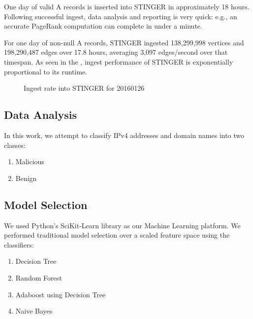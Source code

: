 \documentclass{acm_proc_article-sp}
\begin{document}
One day of valid A records is inserted into STINGER in approximately 18 hours. Following successful ingest, data analysis and reporting is very quick: e.g., an accurate PageRank computation can complete in under a minute.

For one day of non-null A records, STINGER ingested 138,299,998 vertices and 198,290,487 edges over 17.8 hours, averaging 3,097 edges/second over that timespan. As seen in the , ingest performance of STINGER is exponentially proportional to its runtime.

\begin{figure}[ht!]
\centering
{}
\caption{Ingest rate into STINGER for 20160126 \label{overflow}}
\end{figure}




\subsection{Data Analysis}
In this work, we attempt to classify IPv4 addresses and domain names into two classes:
\begin{enumerate}
    \item Malicious
    \item Benign
\end{enumerate}  

\subsection{Model Selection}

We used Python's SciKit-Learn library as our Machine Learning platform. We performed traditional model selection over a scaled feature space using the classifiers:

\begin{enumerate}
    \item Decision Tree
    \item Random Forest
    \item Adaboost using Decision Tree
    \item Naive Bayes
\end{enumerate}
\end{document}
